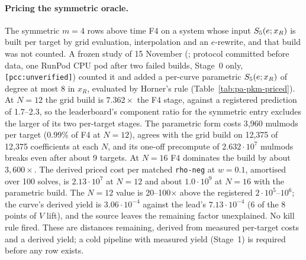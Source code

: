 \paragraph{Pricing the symmetric oracle.} The symmetric $m=4$ rows above
time F4 on a system whose input $S_{5}(e;x_R)$ is built per target by grid
evaluation, interpolation and an $e$-rewrite, and that build was not counted.
A frozen study of 15 November (;
protocol committed before data, one RunPod CPU pod after two failed builds,
Stage~0 only, \texttt{[pcc:unverified]}) counted it and added a per-curve
parametric $S_{5}(e;x_R)$ of degree at most 8 in $x_R$, evaluated by Horner's
rule (Table~\ref{tab:pa-pkm-priced}). At $N=12$ the grid build is
$7.362\times$ the F4 stage, against a registered prediction of 1.7--2.3, so
the leaderboard's component ratio for the symmetric entry excludes the larger
of its two per-target stages. The parametric form costs 3{,}960 mulmods per
target ($0.99\%$ of F4 at $N=12$), agrees with the grid build on 12{,}375 of
12{,}375 coefficients at each $N$, and its one-off precompute of
$2.632\cdot10^7$ mulmods breaks even after about 9 targets. At $N=16$ F4
dominates the build by about $3{,}600\times$. The derived priced cost per
matched \texttt{rho-neg} at $w=0.1$, amortised over 100 solves, is
$2.13\cdot10^7$ at $N=12$ and about $1.0\cdot10^9$ at $N=16$ with the
parametric build. The $N=12$ value is 20--100$\times$ above the registered
$2\cdot10^5$--$10^6$; the curve's derived yield is $3.06\cdot10^{-4}$
against the lead's $7.13\cdot10^{-4}$ (6 of the 8 points of $V$ lift), and
the source leaves the remaining factor unexplained. No kill rule fired.
These are distances remaining, derived from measured per-target costs and a
derived yield; a cold pipeline with measured yield (Stage~1) is required
before any row exists.

